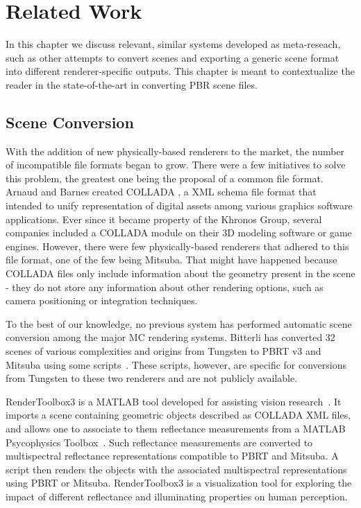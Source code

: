 \chapter{Related Work}
\label{sec:related_work}

In this chapter we discuss relevant, similar systems developed as meta-reseach, such as other attempts to convert scenes and exporting a generic 
scene format into different renderer-specific outputs. This chapter is meant to contextualize the reader in the state-of-the-art in converting PBR scene files.

\section{Scene Conversion}

With the addition of new physically-based renderers to the market, the number of incompatible file formats began to grow. There were a few initiatives to solve this problem, the greatest one being the proposal of a common file format.
Arnaud and Barnes created COLLADA \cite{collada}, a XML schema file format that intended to unify representation of digital assets among 
various graphics software applications. Ever since it became property of the Khronos Group, several companies included a COLLADA module on their 3D modeling 
software or game engines. However, there were few physically-based renderers that adhered to this file format, one of the few being Mitsuba. That might have 
happened because COLLADA files only include information about the geometry present in the scene - they do not store any information about other rendering 
options, such as camera positioning or integration techniques.

To the best of our knowledge, no previous system has performed automatic scene conversion among the major MC rendering systems. Bitterli has converted 32 scenes of various complexities and origins from Tungsten to PBRT v3 and Mitsuba using some scripts~\cite{tungsten}. These scripts, however, are specific for conversions from Tungsten to these two renderers and are not publicly available.

RenderToolbox3 is a MATLAB tool developed for assisting vision research~\cite{rendertoolbox}. It imports a scene containing geometric objects described as COLLADA XML files, and allows one to associate to them reflectance measurements from a MATLAB Psycophysics Toolbox~\cite{Brainard1997}. Such reflectance measurements are converted to multispectral reflectance representations compatible to PBRT and Mitsuba. A script then renders the objects with the associated multispectral representations using PBRT or Mitsuba. RenderToolbox3 is a visualization tool for exploring the impact of different reflectance and illuminating properties on human perception.

